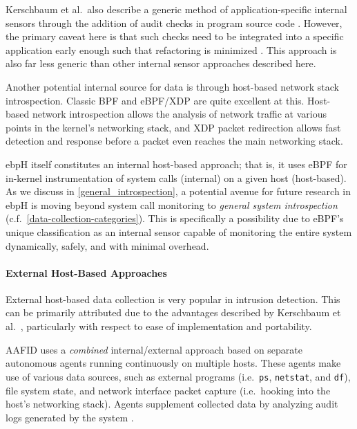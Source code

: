 \documentclass[
  12pt]{findlay}
\newcommand{\passthrough}[1]{#1}
\begin{document}
Kerschbaum et al.~also describe a generic method of application-specific
internal sensors through the addition of audit checks in program source
code \autocite{spafford02}. However, the primary caveat here is that
such checks need to be integrated into a specific application early
enough such that refactoring is minimized \autocite{peng95,spafford02}.
This approach is also far less generic than other internal sensor
approaches described here.

Another potential internal source for data is through host-based network
stack introspection. Classic BPF \autocite{bpf} and eBPF/XDP
\autocite{starovoitov13,starovoitov14,bcc,xdp} are quite excellent at
this. Host-based network introspection allows the analysis of network
traffic at various points in the kernel's networking stack, and XDP
packet redirection \autocite{xdp} allows fast detection and response
before a packet even reaches the main networking stack.

ebpH itself constitutes an internal host-based approach; that is, it
uses eBPF for in-kernel instrumentation of system calls (internal) on a
given host (host-based). As we discuss in
\autoref{general_introspection}, a potential avenue for future research
in ebpH is moving beyond system call monitoring to \emph{general system
introspection} (c.f.~\autoref{data-collection-categories}). This is
specifically a possibility due to eBPF's unique classification as an
internal sensor capable of monitoring the entire system dynamically,
safely, and with minimal overhead.

\hypertarget{external-host-based-approaches}{%
\paragraph{External Host-Based
Approaches}\label{external-host-based-approaches}}

External host-based data collection is very popular in intrusion
detection. This can be primarily attributed due to the advantages
described by Kerschbaum et al.~\autocite{spafford02}, particularly with
respect to ease of implementation and portability.

AAFID \autocite{spafford00} uses a \emph{combined} internal/external
approach based on separate autonomous agents running continuously on
multiple hosts. These agents make use of various data sources, such as
external programs (i.e.~\passthrough{\lstinline!ps!},
\passthrough{\lstinline!netstat!}, and \passthrough{\lstinline!df!}),
file system state, and network interface packet capture (i.e.~hooking
into the host's networking stack). Agents supplement collected data by
analyzing audit logs generated by the system \autocite{spafford02}.
\end{document}
